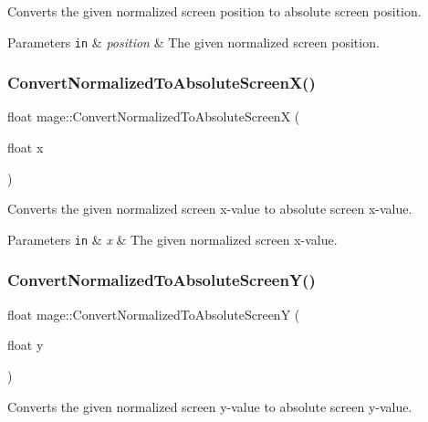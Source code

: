Converts the given normalized screen position to absolute screen position.


\begin{DoxyParams}[1]{Parameters}
\mbox{\tt in}  & {\em position} & The given normalized screen position. \\
\hline
\end{DoxyParams}
\hypertarget{namespacemage_a2dbd3992e0bcb94b465ab4ab6b7d7f83}{}\label{namespacemage_a2dbd3992e0bcb94b465ab4ab6b7d7f83} 
\subsubsection{\texorpdfstring{Convert\+Normalized\+To\+Absolute\+Screen\+X()}{ConvertNormalizedToAbsoluteScreenX()}}
{\footnotesize\ttfamily float mage\+::\+Convert\+Normalized\+To\+Absolute\+ScreenX (\begin{DoxyParamCaption}\item[{float}]{x }\end{DoxyParamCaption})}

Converts the given normalized screen x-\/value to absolute screen x-\/value.


\begin{DoxyParams}[1]{Parameters}
\mbox{\tt in}  & {\em x} & The given normalized screen x-\/value. \\
\hline
\end{DoxyParams}
\hypertarget{namespacemage_abc0e5fd9efdcd160a7c4e9b14c8ec7b6}{}\label{namespacemage_abc0e5fd9efdcd160a7c4e9b14c8ec7b6} 
\subsubsection{\texorpdfstring{Convert\+Normalized\+To\+Absolute\+Screen\+Y()}{ConvertNormalizedToAbsoluteScreenY()}}
{\footnotesize\ttfamily float mage\+::\+Convert\+Normalized\+To\+Absolute\+ScreenY (\begin{DoxyParamCaption}\item[{float}]{y }\end{DoxyParamCaption})}

Converts the given normalized screen y-\/value to absolute screen y-\/value.


